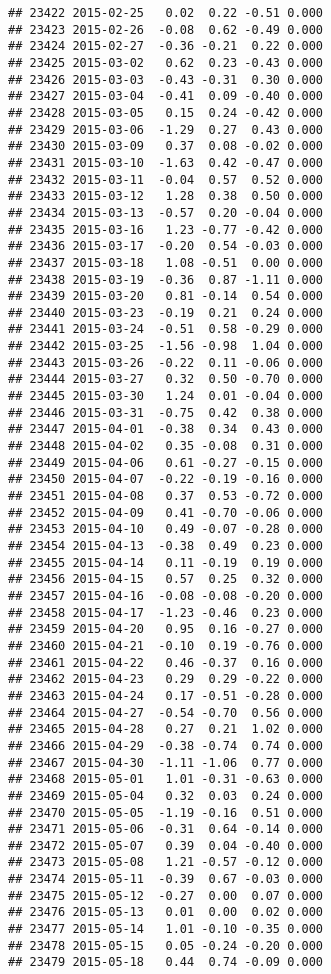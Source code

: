\documentclass[
]{article}
\begin{document}
\begin{verbatim}
## 23422 2015-02-25   0.02  0.22 -0.51 0.000
## 23423 2015-02-26  -0.08  0.62 -0.49 0.000
## 23424 2015-02-27  -0.36 -0.21  0.22 0.000
## 23425 2015-03-02   0.62  0.23 -0.43 0.000
## 23426 2015-03-03  -0.43 -0.31  0.30 0.000
## 23427 2015-03-04  -0.41  0.09 -0.40 0.000
## 23428 2015-03-05   0.15  0.24 -0.42 0.000
## 23429 2015-03-06  -1.29  0.27  0.43 0.000
## 23430 2015-03-09   0.37  0.08 -0.02 0.000
## 23431 2015-03-10  -1.63  0.42 -0.47 0.000
## 23432 2015-03-11  -0.04  0.57  0.52 0.000
## 23433 2015-03-12   1.28  0.38  0.50 0.000
## 23434 2015-03-13  -0.57  0.20 -0.04 0.000
## 23435 2015-03-16   1.23 -0.77 -0.42 0.000
## 23436 2015-03-17  -0.20  0.54 -0.03 0.000
## 23437 2015-03-18   1.08 -0.51  0.00 0.000
## 23438 2015-03-19  -0.36  0.87 -1.11 0.000
## 23439 2015-03-20   0.81 -0.14  0.54 0.000
## 23440 2015-03-23  -0.19  0.21  0.24 0.000
## 23441 2015-03-24  -0.51  0.58 -0.29 0.000
## 23442 2015-03-25  -1.56 -0.98  1.04 0.000
## 23443 2015-03-26  -0.22  0.11 -0.06 0.000
## 23444 2015-03-27   0.32  0.50 -0.70 0.000
## 23445 2015-03-30   1.24  0.01 -0.04 0.000
## 23446 2015-03-31  -0.75  0.42  0.38 0.000
## 23447 2015-04-01  -0.38  0.34  0.43 0.000
## 23448 2015-04-02   0.35 -0.08  0.31 0.000
## 23449 2015-04-06   0.61 -0.27 -0.15 0.000
## 23450 2015-04-07  -0.22 -0.19 -0.16 0.000
## 23451 2015-04-08   0.37  0.53 -0.72 0.000
## 23452 2015-04-09   0.41 -0.70 -0.06 0.000
## 23453 2015-04-10   0.49 -0.07 -0.28 0.000
## 23454 2015-04-13  -0.38  0.49  0.23 0.000
## 23455 2015-04-14   0.11 -0.19  0.19 0.000
## 23456 2015-04-15   0.57  0.25  0.32 0.000
## 23457 2015-04-16  -0.08 -0.08 -0.20 0.000
## 23458 2015-04-17  -1.23 -0.46  0.23 0.000
## 23459 2015-04-20   0.95  0.16 -0.27 0.000
## 23460 2015-04-21  -0.10  0.19 -0.76 0.000
## 23461 2015-04-22   0.46 -0.37  0.16 0.000
## 23462 2015-04-23   0.29  0.29 -0.22 0.000
## 23463 2015-04-24   0.17 -0.51 -0.28 0.000
## 23464 2015-04-27  -0.54 -0.70  0.56 0.000
## 23465 2015-04-28   0.27  0.21  1.02 0.000
## 23466 2015-04-29  -0.38 -0.74  0.74 0.000
## 23467 2015-04-30  -1.11 -1.06  0.77 0.000
## 23468 2015-05-01   1.01 -0.31 -0.63 0.000
## 23469 2015-05-04   0.32  0.03  0.24 0.000
## 23470 2015-05-05  -1.19 -0.16  0.51 0.000
## 23471 2015-05-06  -0.31  0.64 -0.14 0.000
## 23472 2015-05-07   0.39  0.04 -0.40 0.000
## 23473 2015-05-08   1.21 -0.57 -0.12 0.000
## 23474 2015-05-11  -0.39  0.67 -0.03 0.000
## 23475 2015-05-12  -0.27  0.00  0.07 0.000
## 23476 2015-05-13   0.01  0.00  0.02 0.000
## 23477 2015-05-14   1.01 -0.10 -0.35 0.000
## 23478 2015-05-15   0.05 -0.24 -0.20 0.000
## 23479 2015-05-18   0.44  0.74 -0.09 0.000

\end{verbatim}
\end{document}
